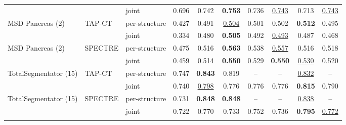 \begin{tabular}{lllccccccc}
 &  & joint & \cellcolor{modebest}0.696 & \cellcolor{modebest}0.742 & \textbf{0.753} & \cellcolor{modebest}0.736 & \underline{0.743} & 0.713 & \cellcolor{modebest}\underline{0.743} \\
\addlinespace[2pt]
MSD Pancreas (2) & TAP-CT & per-structure & \cellcolor{modebest}0.427 & \cellcolor{modebest}0.491 & \underline{0.504} & \cellcolor{modebest}0.501 & \cellcolor{modebest}0.502 & \cellcolor{modebest}\textbf{0.512} & \cellcolor{modebest}0.495 \\
 &  & joint & 0.334 & 0.480 & \cellcolor{modebest}\textbf{0.505} & 0.492 & \underline{0.493} & 0.487 & 0.468 \\
\addlinespace[2pt]
MSD Pancreas (2) & SPECTRE & per-structure & \cellcolor{modebest}0.475 & \cellcolor{modebest}0.516 & \cellcolor{modebest}\textbf{0.563} & \cellcolor{modebest}0.538 & \cellcolor{modebest}\underline{0.557} & 0.516 & 0.518 \\
 &  & joint & 0.459 & 0.514 & \textbf{0.550} & 0.529 & \textbf{0.550} & \cellcolor{modebest}\underline{0.530} & \cellcolor{modebest}0.520 \\
\addlinespace[2pt]
TotalSegmentator (15) & TAP-CT & per-structure & \cellcolor{modebest}0.747 & \cellcolor{modebest}\textbf{0.843} & \cellcolor{modebest}0.819 & -- & -- & \cellcolor{modebest}\underline{0.832} & -- \\
 &  & joint & 0.740 & \underline{0.798} & 0.776 & 0.776 & 0.776 & \textbf{0.815} & 0.790 \\
\addlinespace[2pt]
TotalSegmentator (15) & SPECTRE & per-structure & \cellcolor{modebest}0.731 & \cellcolor{modebest}\textbf{0.848} & \cellcolor{modebest}\textbf{0.848} & -- & -- & \cellcolor{modebest}\underline{0.838} & -- \\
 &  & joint & 0.722 & 0.770 & 0.733 & 0.752 & 0.736 & \textbf{0.795} & \underline{0.772} \\
\addlinespace[2pt]
\bottomrule
\end{tabular}
